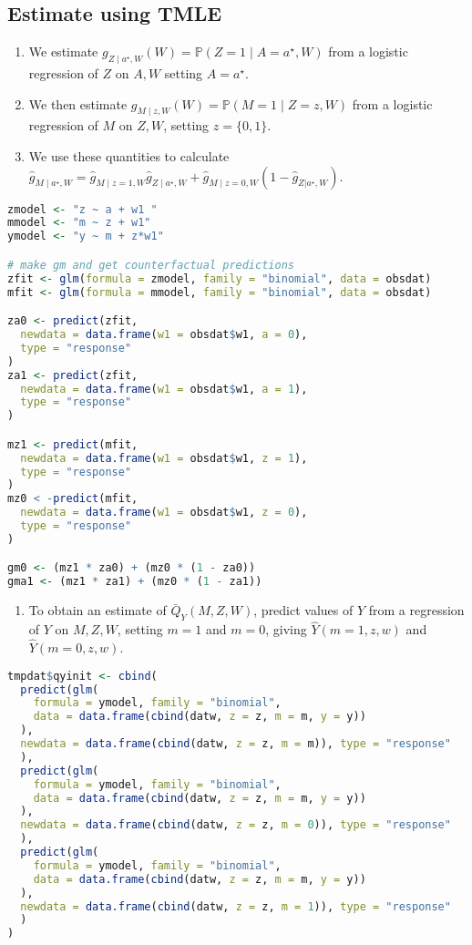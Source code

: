 \documentclass[
  12pt,
]{book}
\providecommand{\tightlist}{%
  \setlength{\itemsep}{0pt}\setlength{\parskip}{0pt}}
\theoremstyle{definition}
\theoremstyle{definition}
\theoremstyle{definition}
\renewcommand{\P}{\mathbb{P}}
\newcommand{\1}{\mathbbm{1}}
\begin{document}
\hypertarget{estimate-using-tmle}{%
\subsection{Estimate using TMLE}\label{estimate-using-tmle}}

\begin{enumerate}
\def\labelenumi{\arabic{enumi}.}
\tightlist
\item
  We estimate \(g_{Z \mid a^{\star}, W}(W) = \P(Z=1 \mid A=a^{\star}, W)\) from
  a logistic regression of \(Z\) on \(A, W\) setting \(A=a^{\star}\).
\item
  We then estimate \(g_{M \mid z,W}(W) = \P(M=1 \mid Z=z, W)\) from a logistic
  regression of \(M\) on \(Z, W\), setting \(z=\{0,1\}\).
\item
  We use these quantities to calculate \(\hat{g}_{M \mid a^{\star}, W} = \hat{g}_{M \mid z=1,W}\hat{g}_{Z \mid a^{\star}, W} + \hat{g}_{M \mid z=0,W}(1-\hat{g}_{Z|a^{\star}, W})\).
\end{enumerate}

\begin{lstlisting}[language=R]
zmodel <- "z ~ a + w1 "
mmodel <- "m ~ z + w1"
ymodel <- "y ~ m + z*w1"

# make gm and get counterfactual predictions
zfit <- glm(formula = zmodel, family = "binomial", data = obsdat)
mfit <- glm(formula = mmodel, family = "binomial", data = obsdat)

za0 <- predict(zfit,
  newdata = data.frame(w1 = obsdat$w1, a = 0),
  type = "response"
)
za1 <- predict(zfit,
  newdata = data.frame(w1 = obsdat$w1, a = 1),
  type = "response"
)

mz1 <- predict(mfit,
  newdata = data.frame(w1 = obsdat$w1, z = 1),
  type = "response"
)
mz0 < -predict(mfit,
  newdata = data.frame(w1 = obsdat$w1, z = 0),
  type = "response"
)

gm0 <- (mz1 * za0) + (mz0 * (1 - za0))
gma1 <- (mz1 * za1) + (mz0 * (1 - za1))
\end{lstlisting}

\begin{enumerate}
\def\labelenumi{\arabic{enumi}.}
\setcounter{enumi}{3}
\tightlist
\item
  To obtain an estimate of \(\bar{Q}_{Y}(M,Z,W)\), predict values of \(Y\) from a
  regression of \(Y\) on \(M,Z,W\), setting \(m=1\) and \(m=0\), giving
  \(\hat{Y}(m=1, z, w)\) and \(\hat{Y}(m=0, z, w)\).
\end{enumerate}

\begin{lstlisting}[language=R]
tmpdat$qyinit <- cbind(
  predict(glm(
    formula = ymodel, family = "binomial",
    data = data.frame(cbind(datw, z = z, m = m, y = y))
  ),
  newdata = data.frame(cbind(datw, z = z, m = m)), type = "response"
  ),
  predict(glm(
    formula = ymodel, family = "binomial",
    data = data.frame(cbind(datw, z = z, m = m, y = y))
  ),
  newdata = data.frame(cbind(datw, z = z, m = 0)), type = "response"
  ),
  predict(glm(
    formula = ymodel, family = "binomial",
    data = data.frame(cbind(datw, z = z, m = m, y = y))
  ),
  newdata = data.frame(cbind(datw, z = z, m = 1)), type = "response"
  )
)
\end{lstlisting}
\end{document}
